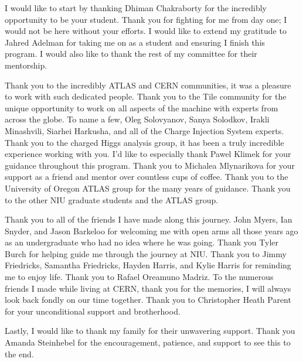I would like to start by thanking Dhiman Chakraborty for the incredibly opportunity to be your student. Thank you for fighting for me from day one; I would not be here without your efforts. I would like to extend my gratitude to Jahred Adelman for taking me on as a student and ensuring I finish this program. I would also like to thank the rest of my committee for their mentorship. 

Thank you to the incredibly ATLAS and CERN communities, it was a pleasure to work with such dedicated people. Thank you to the Tile community for the unique opportunity to work on all aspects of the machine with experts from across the globe. To name a few, Oleg Solovyanov, Sanya Solodkov, Irakli Minashvili, Siarhei Harkusha, and all of the Charge Injection System experts. Thank you to the charged Higgs analysis group, it has been a truly incredible experience working with you. I'd like to especially thank Pawel Klimek for your guidance throughout this program. Thank you to Michalea Mlynarikova for your support as a friend and mentor over countless cups of coffee. Thank you to the University of Oregon ATLAS group for the many years of guidance. Thank you to the other NIU graduate students and the ATLAS group.

Thank you to all of the friends I have made along this journey. John Myers, Ian Snyder, and Jason Barkeloo for welcoming me with open arms all those years ago as an undergraduate who had no idea where he was going. Thank you Tyler Burch for helping guide me through the journey at NIU. Thank you to Jimmy Friedricks, Samantha Friedricks, Hayden Harris, and Kylie Harris for reminding me to enjoy life. Thank you to Rafael Oreamuno Madriz. To the numerous friends I made while living at CERN, thank you for the memories, I will always look back fondly on our time together. Thank you to Christopher Heath Parent for your unconditional support and brotherhood.

Lastly, I would like to thank my family for their unwavering support. Thank you Amanda Steinhebel for the encouragement, patience, and support to see this to the end.